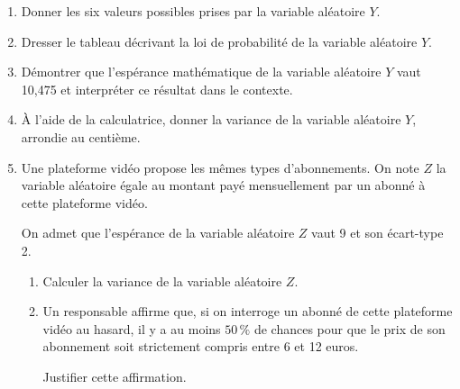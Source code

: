\documentclass[10pt]{article}
\begin{document}
\begin{enumerate}
\item Donner les six valeurs possibles prises par la variable aléatoire $Y$.
\item Dresser le tableau décrivant la loi de probabilité de la variable aléatoire $Y$.
\item Démontrer que l'espérance mathématique de la variable aléatoire $Y$ vaut 10,475 et interpréter ce résultat dans le contexte.
\item À l'aide de la calculatrice, donner la variance de la variable aléatoire $Y$, arrondie au centième.
\item Une plateforme vidéo propose les mêmes types d'abonnements. On note $Z$ la variable aléatoire égale au montant payé mensuellement par un abonné à cette plateforme vidéo.

On admet que l'espérance de la variable aléatoire $Z$ vaut 9 et son écart-type 2.
	\begin{enumerate}
		\item Calculer la variance de la variable aléatoire $Z$.
		\item Un responsable affirme que, si on interroge un abonné de cette plateforme vidéo au hasard, il y a au moins $50\,\%$ de chances pour que le prix de son abonnement soit strictement compris entre 6 et 12 euros.

		Justifier cette affirmation.
	\end{enumerate}
	\end{enumerate}
\end{document}
